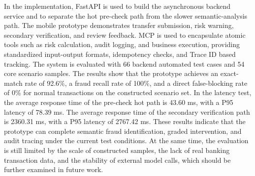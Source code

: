 In the implementation, FastAPI is used to build the asynchronous backend service and to separate the hot pre-check path from the slower semantic-analysis path. The mobile prototype demonstrates transfer submission, risk warning, secondary verification, and review feedback. MCP is used to encapsulate atomic tools such as risk calculation, audit logging, and business execution, providing standardized input-output formats, idempotency checks, and Trace ID based tracking. The system is evaluated with 66 backend automated test cases and 54 core scenario samples. The results show that the prototype achieves an exact-match rate of 92.6\%, a fraud recall rate of 100\%, and a direct false-blocking rate of 0\% for normal transactions on the constructed scenario set. In the latency test, the average response time of the pre-check hot path is 43.60 ms, with a P95 latency of 78.39 ms. The average response time of the secondary verification path is 2360.31 ms, with a P95 latency of 2767.42 ms. These results indicate that the prototype can complete semantic fraud identification, graded intervention, and audit tracing under the current test conditions. At the same time, the evaluation is still limited by the scale of constructed samples, the lack of real banking transaction data, and the stability of external model calls, which should be further examined in future work.
